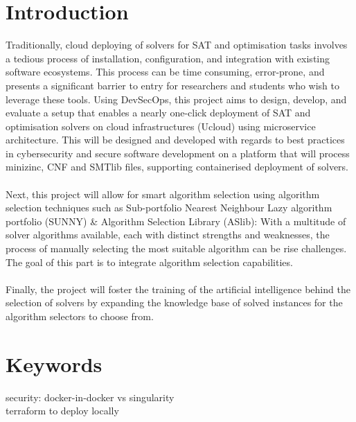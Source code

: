 \documentclass[12pt]{article}
\begin{document}
\section{Introduction}
Traditionally, cloud deploying of solvers for SAT and optimisation tasks involves a tedious process of installation, configuration, and integration with existing software ecosystems.  This process can be time consuming, error-prone, and presents a significant barrier to entry for researchers and students who wish to leverage these tools.  Using DevSecOps, this project aims to design, develop, and evaluate a setup that enables a nearly one-click deployment of SAT and optimisation solvers on cloud infrastructures (Ucloud) using microservice architecture.  This will be designed and developed with regards to best practices in cybersecurity and secure software development on a platform that will process minizinc, CNF and SMTlib files, supporting containerised deployment of solvers.\\
\\
Next,  this  project  will  allow  for  smart  algorithm  selection  using  algorithm  selection  techniques such as Sub-portfolio Nearest Neighbour Lazy algorithm portfolio (SUNNY) \& Algorithm Selection Library (ASlib):  With a multitude of solver algorithms available, each with distinct strengths and weaknesses,  the process of manually selecting the most suitable algorithm can be rise challenges. The goal of this part is to integrate algorithm selection capabilities.\\
\\
Finally, the project will foster the training of the artificial intelligence behind the selection of solvers by expanding the knowledge base of solved instances for the algorithm selectors to choose from.
\section{Keywords}
security: docker-in-docker vs singularity\\
terraform to deploy locally



\end{document}
